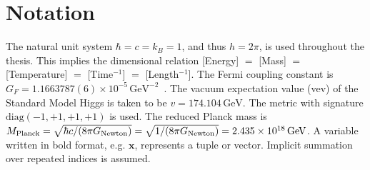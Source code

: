 \chapter*{Notation}
%
%
The natural unit system $\hbar = c = k_{B} = 1$, and thus $h = 2\pi$, is used throughout the thesis.
This implies the dimensional relation [Energy] $=$ [Mass] $=$ [Temperature] $=$ [Time$^{-1}$] $=$ [Length$^{-1}$].
The Fermi coupling constant is $G_F = 1.1663787(6) \times 10^{-5}\,\mathrm{GeV}^{-2}$~\cite{pdg}.
The vacuum expectation value (vev) of the Standard Model Higgs is taken to be $v = 174.104\,\mathrm{GeV}$.
The metric with signature $\text{diag}(-1,+1,+1,+1)$ is used.
The reduced Planck mass is $M_{\mathrm{Planck}}= \sqrt{\hbar c/(8\pi G_{\text{Newton}})} = \sqrt{1/(8\pi G_{\text{Newton}})} = 2.435 \times 10^{18}\,{\mathrm{GeV}}$.
A variable written in bold format, e.g. $\mathbf{x}$, represents a tuple or vector.
Implicit summation over repeated indices is assumed.








